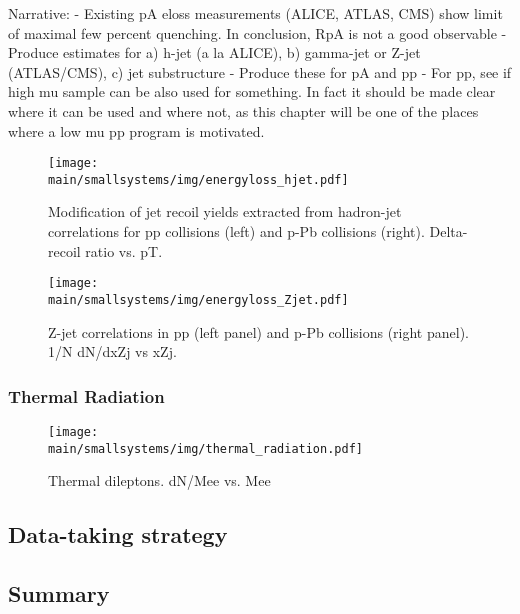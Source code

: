 \documentclass[../report.tex]{subfiles}
\providecommand{\main}{..}
\begin{document}
Narrative: 
- Existing pA eloss measurements (ALICE, ATLAS, CMS) show limit of maximal few percent quenching. In conclusion, RpA is not a good observable
- Produce estimates for a) h-jet (a la ALICE), b) gamma-jet or Z-jet (ATLAS/CMS), c) jet substructure
- Produce these for pA and pp
- For pp, see if high mu sample can be also used for something. In fact it should be made clear where it can be used and where not, as this chapter will be one of the places where a low mu pp program is motivated.

\begin{figure}[ht]
\centering
\texttt{[image: \\main/smallsystems/img/energyloss\_hjet.pdf]}
\caption{Modification of jet recoil yields extracted from hadron-jet correlations for pp collisions (left) and p-Pb collisions (right). Delta-recoil ratio vs. pT.}
\label{fig:smallsystems_energyloss_hjet}
\end{figure}

\begin{figure}[ht]
\centering
\texttt{[image: \\main/smallsystems/img/energyloss\_Zjet.pdf]}

\caption{Z-jet correlations in pp (left panel) and p-Pb collisions (right panel). 1/N dN/dxZj vs xZj.}
\label{fig:smallsystems_energyloss_Zjet}
\end{figure}

\subsubsection{Thermal Radiation}

\begin{figure}[ht]
\centering
\texttt{[image: \\main/smallsystems/img/thermal\_radiation.pdf]}

\caption{Thermal dileptons. dN/Mee vs. Mee}
\label{fig:smallsystems_thermal_radition}
\end{figure}

\subsection{Data-taking strategy}


\subsection{Summary}



\end{document}
